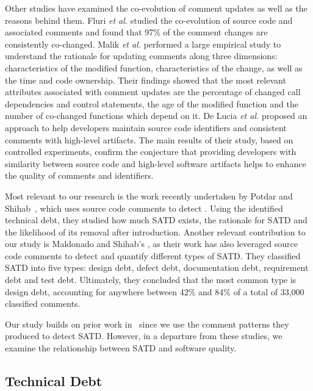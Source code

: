 Other studies have examined the co-evolution of comment updates as well as the reasons behind them. Fluri {\em et al.} \cite{fluri2007code} studied the co-evolution of source code and associated comments and found that 97\% of the comment changes are consistently co-changed. Malik {\em et al.}  \cite{malik2008understanding} performed a large empirical study to understand the rationale for updating comments along three dimensions: characteristics of the modified function, characteristics of the change, as well as the time and code ownership. Their findings showed that the most relevant attributes associated with comment updates are the percentage of changed call dependencies and control statements, the age of the modified function and the number of co-changed functions which depend on it. De Lucia {\em et al.} \cite{DeLucia2011} proposed an approach to help developers maintain source code identifiers and consistent comments with high-level artifacts. The main results of their study, based on controlled experiments, confirm the conjecture that providing  developers with similarity between source code and high-level software artifacts helps to enhance the quality of comments and identifiers.



Most relevant to our research is the work recently undertaken by Potdar and Shihab~\cite{ICSM_PotdarS14}, which uses source code comments to detect \SATD. Using the identified technical debt, they studied  how much SATD exists, the rationale for SATD and the likelihood of its removal after introduction. Another relevant contribution to our study is Maldonado and Shihab's \cite{MTD15p9}, as their work has also leveraged source code comments to detect and quantify different types of SATD. They classified SATD into five types:  design debt, defect debt, documentation debt, requirement debt and test debt. Ultimately, they concluded that  the  most common type is design debt, accounting for anywhere between 42\% and 84\% of a total of 33,000 classified comments.

Our study builds on prior work in~\cite{ICSM_PotdarS14,MTD15p9} since we use the comment patterns they produced to detect SATD. However, in a departure from these studies, we examine the relationship between SATD and software quality.


\subsection{Technical Debt}


